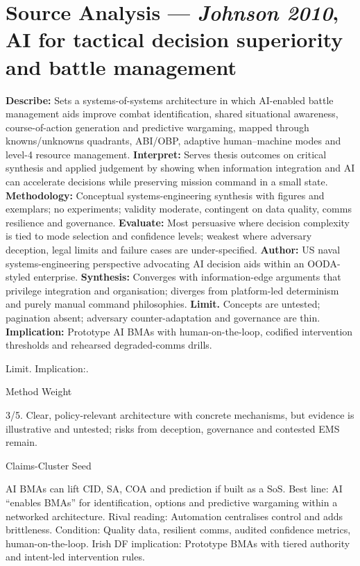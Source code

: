 \section*{Source Analysis — \textit{Johnson 2010}, AI for tactical decision superiority and battle management}
\textbf{Describe:} Sets a systems-of-systems architecture in which AI-enabled battle management aids improve combat identification, shared situational awareness, course-of-action generation and predictive wargaming, mapped through knowns/unknowns quadrants, ABI/OBP, adaptive human–machine modes and level-4 resource management.
\textbf{Interpret:} Serves thesis outcomes on critical synthesis and applied judgement by showing when information integration and AI can accelerate decisions while preserving mission command in a small state.
\textbf{Methodology:} Conceptual systems-engineering synthesis with figures and exemplars; no experiments; validity moderate, contingent on data quality, comms resilience and governance.
\textbf{Evaluate:} Most persuasive where decision complexity is tied to mode selection and confidence levels; weakest where adversary deception, legal limits and failure cases are under-specified.
\textbf{Author:} US naval systems-engineering perspective advocating AI decision aids within an OODA-styled enterprise.
\textbf{Synthesis:} Converges with information-edge arguments that privilege integration and organisation; diverges from platform-led determinism and purely manual command philosophies.
\textbf{Limit.} Concepts are untested; pagination absent; adversary counter-adaptation and governance are thin.
\textbf{Implication:} Prototype AI BMAs with human-on-the-loop, codified intervention thresholds and rehearsed degraded-comms drills.

Limit. Implication:.

Method Weight

3/5. Clear, policy-relevant architecture with concrete mechanisms, but evidence is illustrative and untested; risks from deception, governance and contested EMS remain.

Claims-Cluster Seed

AI BMAs can lift CID, SA, COA and prediction if built as a SoS.
Best line: AI “enables BMAs” for identification, options and predictive wargaming within a networked architecture.
Rival reading: Automation centralises control and adds brittleness.
Condition: Quality data, resilient comms, audited confidence metrics, human-on-the-loop.
Irish DF implication: Prototype BMAs with tiered authority and intent-led intervention rules.

